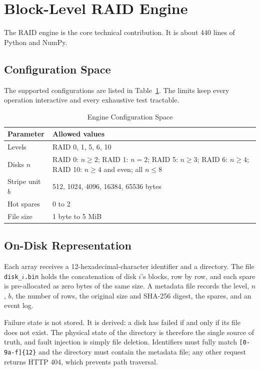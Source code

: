 \documentclass{ieeeaccess}
\begin{document}
\section{Block-Level RAID Engine}
\label{sec:engine}

The RAID engine is the core technical contribution. It is about 440 lines of Python and NumPy.

\subsection{Configuration Space}
The supported configurations are listed in Table~\ref{tab:config}. The limits keep every operation interactive and every exhaustive test tractable.

\begin{table}[!t]
\caption{Engine Configuration Space}
\label{tab:config}
\centering
\footnotesize
\begin{tabular}{p{2.0cm}p{5.6cm}}
\toprule
Parameter & Allowed values \\
\midrule
Levels & RAID 0, 1, 5, 6, 10 \\
Disks $n$ & RAID 0: $n \ge 2$; RAID 1: $n=2$; RAID 5: $n \ge 3$; RAID 6: $n \ge 4$; RAID 10: $n \ge 4$ and even; all $n \le 8$ \\
Stripe unit $b$ & 512, 1024, 4096, 16384, 65536 bytes \\
Hot spares & 0 to 2 \\
File size & 1 byte to 5 MiB \\
\bottomrule
\end{tabular}
\end{table}

\subsection{On-Disk Representation}
Each array receives a 12-hexadecimal-character identifier and a directory. The file \texttt{disk\_$i$.bin} holds the concatenation of disk $i$'s blocks, row by row, and each spare is pre-allocated as zero bytes of the same size. A metadata file records the level, $n$, $b$, the number of rows, the original size and SHA-256 digest, the spares, and an event log.

Failure state is not stored. It is derived: a disk has failed if and only if its file does not exist. The physical state of the directory is therefore the single source of truth, and fault injection is simply file deletion. Identifiers must fully match \texttt{[0-9a-f]\{12\}} and the directory must contain the metadata file; any other request returns HTTP 404, which prevents path traversal.
\end{document}
